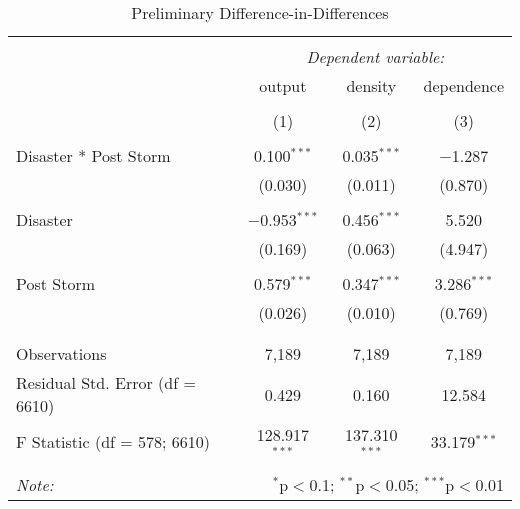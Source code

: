
\begin{table}[!htbp] \centering 
  \caption{Preliminary Difference-in-Differences} 
  \label{} 
\small 
\begin{tabular}{@{\extracolsep{5pt}}lccc} 
\\[-1.8ex]\hline 
\hline \\[-1.8ex] 
 & \multicolumn{3}{c}{\textit{Dependent variable:}} \\ 
\cline{2-4} 
 & output & density & dependence \\ 
\\[-1.8ex] & (1) & (2) & (3)\\ 
\hline \\[-1.8ex] 
 Disaster * Post Storm & 0.100$^{***}$ & 0.035$^{***}$ & $-$1.287 \\ 
  & (0.030) & (0.011) & (0.870) \\ 
  & & & \\ 
 Disaster & $-$0.953$^{***}$ & 0.456$^{***}$ & 5.520 \\ 
  & (0.169) & (0.063) & (4.947) \\ 
  & & & \\ 
 Post Storm & 0.579$^{***}$ & 0.347$^{***}$ & 3.286$^{***}$ \\ 
  & (0.026) & (0.010) & (0.769) \\ 
  & & & \\ 
\hline \\[-1.8ex] 
Observations & 7,189 & 7,189 & 7,189 \\ 
Residual Std. Error (df = 6610) & 0.429 & 0.160 & 12.584 \\ 
F Statistic (df = 578; 6610) & 128.917$^{***}$ & 137.310$^{***}$ & 33.179$^{***}$ \\ 
\hline 
\hline \\[-1.8ex] 
\textit{Note:}  & \multicolumn{3}{r}{$^{*}$p$<$0.1; $^{**}$p$<$0.05; $^{***}$p$<$0.01} \\ 
\end{tabular} 
\end{table} 
